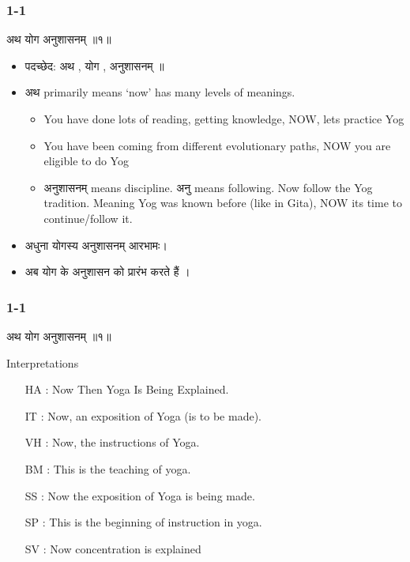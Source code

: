 \begin{frame}[fragile]\frametitle{1-1}

\begin{sanskrit}
अथ योग अनुशासनम् ॥१॥
\end{sanskrit}


\begin{itemize}
\item पदच्छेद: अथ , योग , अनुशासनम् ॥
\item अथ primarily means `now' has many levels of meanings.
	\begin{itemize}
	\item You have done lots of reading, getting knowledge, NOW, lets practice Yog
	\item You have been coming from different evolutionary paths, NOW you are eligible to do Yog
	\item अनुशासनम् means discipline. अनु means following. Now follow the Yog tradition. Meaning Yog was known before (like in Gita), NOW its time to continue/follow it.
	\end{itemize}	
\item अधुना योगस्य अनुशासनम् आरभामः।
\item अब योग के अनुशासन को प्रारंभ करते हैं ।		
\end{itemize}

\end{frame}


\begin{frame}[fragile]\frametitle{1-1}

\begin{sanskrit}
अथ योग अनुशासनम् ॥१॥
\end{sanskrit}

Interpretations
\begin{itemize}
\item [HA]: Now Then Yoga Is Being Explained.
\item [IT]: Now, an exposition of Yoga (is to be made).
\item [VH]: Now, the instructions of Yoga.
\item [BM]: This is the teaching of yoga.
\item [SS]: Now the exposition of Yoga is being made.
\item [SP]: This is the beginning of instruction in yoga.
\item [SV]: Now concentration is explained
\end{itemize}

\end{frame}


